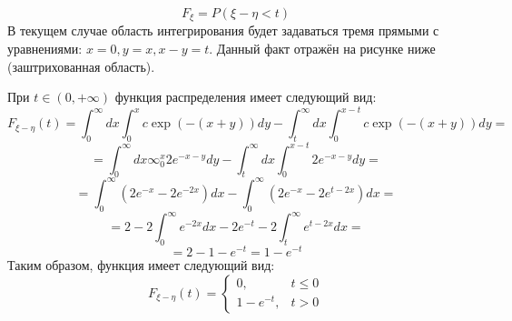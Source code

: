 \begin{itemize}
	 \[ F_{\xi} = P(\xi - \eta < t) \]
	 В текущем случае область интегрирования будет задаваться тремя прямыми с уравнениями: $x=0, y=x, x-y=t$. Данный факт отражён на рисунке ниже (заштрихованная область).
	 \begin{figure}[H]
	 \end{figure}
 	При $t \in (0, +\infty)$ функция распределения имеет следующий вид:
 	\[ F_{\xi - \eta}(t) = \int_{0}^{\infty} dx \int_{0}^{x} c \exp (-(x+y)) dy - \int_{t}^{\infty} dx \int_{0}^{x-t} c \exp (-(x+y)) dy = \]
 	\[ = \int_{0}^{\infty} dx \infty_{0}^{x} 2 e^{-x-y} dy - \int_{t}^{\infty} dx \int_{0}^{x-t} 2e^{-x-y}dy = \]
 	\[ = \int_{0}^{\infty} (2e^{-x} - 2e^{-2x}) dx - \int_{0}^{\infty} (2e^{-x}-2e^{t-2x})dx = \]
 	\[ = 2 - 2 \int_{0}^{\infty} e^{-2x} dx - 2e^{-t} - 2 \int_{t}^{\infty} e^{t-2x} dx = \]
 	\[ = 2 - 1 - e^{-t} = 1 - e^{-t} \]
 	Таким образом, функция имеет следующий вид:
 	\[
 	F_{\xi - \eta} (t) =
 	\begin{cases}
 		0, &t \le 0 \\
 		1 - e^{-t}, &t > 0
 	\end{cases}
 	\]
\end{itemize}

 